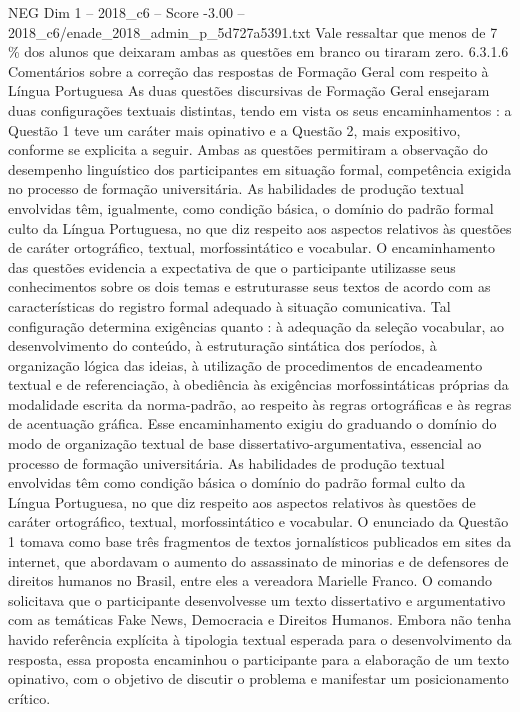 \begin{textsample}{NEG Dim 1 – 2018\_c6 – Score -3.00 – 2018\_c6/enade\_2018\_admin\_p\_5d727a5391.txt}
Vale ressaltar que menos de 7 \% dos alunos que deixaram ambas as questões em branco ou tiraram zero. 6.3.1.6 Comentários sobre a correção das respostas de Formação Geral com respeito à Língua Portuguesa As duas questões discursivas de Formação Geral ensejaram duas configurações textuais distintas, tendo em vista os seus encaminhamentos : a Questão 1 teve um caráter mais opinativo e a Questão 2, mais expositivo, conforme se explicita a seguir.
Ambas as questões permitiram a observação do desempenho linguístico dos participantes em situação formal, competência exigida no processo de formação universitária.
As habilidades de produção textual envolvidas têm, igualmente, como condição básica, o domínio do padrão formal culto da Língua Portuguesa, no que diz respeito aos aspectos relativos às questões de caráter ortográfico, textual, morfossintático e vocabular.
O encaminhamento das questões evidencia a expectativa de que o participante utilizasse seus conhecimentos sobre os dois temas e estruturasse seus textos de acordo com as características do registro formal adequado à situação comunicativa.
Tal configuração determina exigências quanto : à adequação da seleção vocabular, ao desenvolvimento do conteúdo, à estruturação sintática dos períodos, à organização lógica das ideias, à utilização de procedimentos de encadeamento textual e de referenciação, à obediência às exigências morfossintáticas próprias da modalidade escrita da norma-padrão, ao respeito às regras ortográficas e às regras de acentuação gráfica.
Esse encaminhamento exigiu do graduando o domínio do modo de organização textual de base dissertativo-argumentativa, essencial ao processo de formação universitária.
As habilidades de produção textual envolvidas têm como condição básica o domínio do padrão formal culto da Língua Portuguesa, no que diz respeito aos aspectos relativos às questões de caráter ortográfico, textual, morfossintático e vocabular.
O enunciado da Questão 1 tomava como base três fragmentos de textos jornalísticos publicados em sites da internet, que abordavam o aumento do assassinato de minorias e de defensores de direitos humanos no Brasil, entre eles a vereadora Marielle Franco.
O comando solicitava que o participante desenvolvesse um texto dissertativo e argumentativo com as temáticas Fake News, Democracia e Direitos Humanos.
Embora não tenha havido referência explícita à tipologia textual esperada para o desenvolvimento da resposta, essa proposta encaminhou o participante para a elaboração de um texto opinativo, com o objetivo de discutir o problema e manifestar um posicionamento crítico.

\end{textsample}

